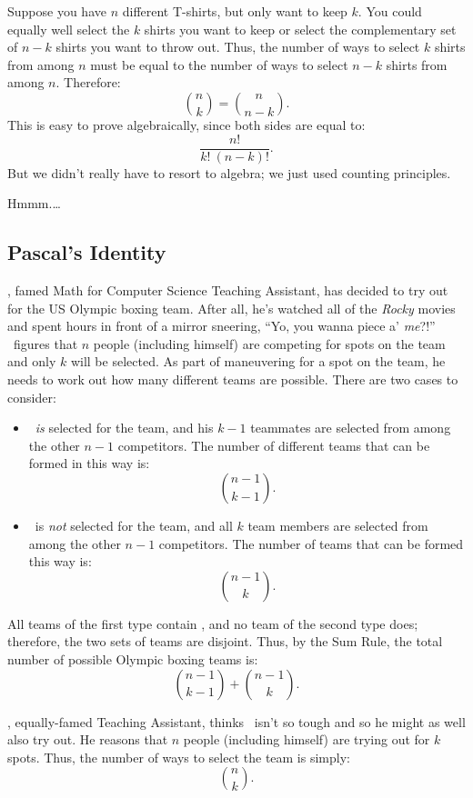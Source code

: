 Suppose you have $n$ different T-shirts, but only want to keep $k$.
You could equally well select the $k$ shirts you want to keep or
select the complementary set of $n - k$ shirts you want to throw out.
Thus, the number of ways to select $k$ shirts from among $n$ must be
equal to the number of ways to select $n - k$ shirts from among $n$.
Therefore:
%
\[
    \binom{n}{k} = \binom{n}{n-k}.
\]
%
This is easy to prove algebraically, since both sides are equal to:
%
\[
    \frac{n!}{k!\ (n-k)!}.
\]
%
But we didn't really have to resort to algebra; we just used counting
principles.

Hmmm.\dots

\subsection{Pascal's Identity}

\Jay, famed Math for Computer Science Teaching Assistant, has decided
to try out for the US Olympic boxing team.  After all, he's watched
all of the \emph{Rocky} movies and spent hours in front of a mirror
sneering, ``Yo, you wanna piece a' \emph{me}?!''  \Jay\ figures that $n$
people (including himself) are competing for spots on the team and
only $k$ will be selected.  As part of maneuvering for a spot on the
team, he needs to work out how many different teams are possible.
There are two cases to consider:

\begin{itemize}

\item \Jay\ \emph{is} selected for the team, and his $k - 1$
  teammates are selected from among the other $n - 1$ competitors.
  The number of different teams that can be formed in this way is:
%
\[
    \binom{n-1}{k-1}.
\]

\item \Jay\ is \emph{not} selected for the team, and all $k$ team
members are selected from among the other $n - 1$ competitors.  The
number of teams that can be formed this way is:
%
\[
    \binom{n - 1}{k}.
\]

\end{itemize}

All teams of the first type contain \Jay, and no team of the second
type does; therefore, the two sets of teams are disjoint.  Thus, by
the Sum Rule, the total number of possible Olympic boxing teams is:
%
\[
    \binom{n-1}{k-1} + \binom{n - 1}{k}.
\]

\Jer, equally-famed Teaching Assistant, thinks \Jay\ isn't so tough
and so he might as well also try out.  He reasons that $n$ people
(including himself) are trying out for $k$ spots.  Thus, the number of
ways to select the team is simply:
%
\[
    \binom{n}{k}.
\]

